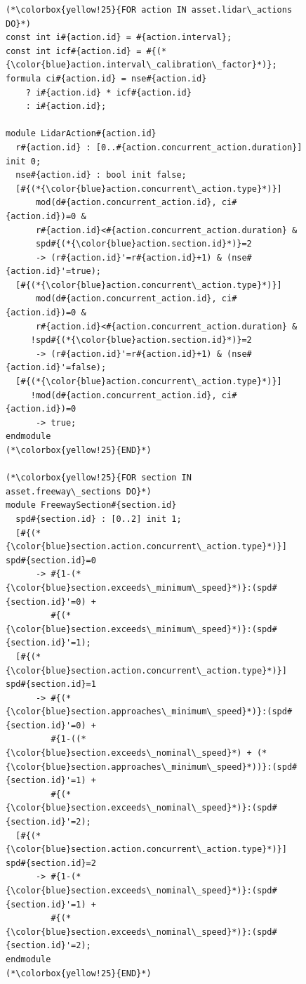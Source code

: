 \begin{figure}[!ht]
\begin{lstlisting}[caption={DTMC template for traffic surveillance},label=lst:DTMC_traffic_surveillance_template]
(*\colorbox{yellow!25}{FOR action IN asset.lidar\_actions DO}*)
const int i#{action.id} = #{action.interval};
const int icf#{action.id} = #{(*{\color{blue}action.interval\_calibration\_factor}*)};
formula ci#{action.id} = nse#{action.id}
    ? i#{action.id} * icf#{action.id}
    : i#{action.id};

module LidarAction#{action.id}
  r#{action.id} : [0..#{action.concurrent_action.duration}] init 0;
  nse#{action.id} : bool init false;
  [#{(*{\color{blue}action.concurrent\_action.type}*)}]
      mod(d#{action.concurrent_action.id}, ci#{action.id})=0 &
      r#{action.id}<#{action.concurrent_action.duration} &
      spd#{(*{\color{blue}action.section.id}*)}=2
      -> (r#{action.id}'=r#{action.id}+1) & (nse#{action.id}'=true);
  [#{(*{\color{blue}action.concurrent\_action.type}*)}]
      mod(d#{action.concurrent_action.id}, ci#{action.id})=0 &
      r#{action.id}<#{action.concurrent_action.duration} &
     !spd#{(*{\color{blue}action.section.id}*)}=2
      -> (r#{action.id}'=r#{action.id}+1) & (nse#{action.id}'=false);
  [#{(*{\color{blue}action.concurrent\_action.type}*)}]
     !mod(d#{action.concurrent_action.id}, ci#{action.id})=0
      -> true;
endmodule
(*\colorbox{yellow!25}{END}*)

(*\colorbox{yellow!25}{FOR section IN asset.freeway\_sections DO}*)
module FreewaySection#{section.id}
  spd#{section.id} : [0..2] init 1;
  [#{(*{\color{blue}section.action.concurrent\_action.type}*)}] spd#{section.id}=0
      -> #{1-(*{\color{blue}section.exceeds\_minimum\_speed}*)}:(spd#{section.id}'=0) +
         #{(*{\color{blue}section.exceeds\_minimum\_speed}*)}:(spd#{section.id}'=1);
  [#{(*{\color{blue}section.action.concurrent\_action.type}*)}] spd#{section.id}=1
      -> #{(*{\color{blue}section.approaches\_minimum\_speed}*)}:(spd#{section.id}'=0) +
         #{1-((*{\color{blue}section.exceeds\_nominal\_speed}*) + (*{\color{blue}section.approaches\_minimum\_speed}*))}:(spd#{section.id}'=1) +
         #{(*{\color{blue}section.exceeds\_nominal\_speed}*)}:(spd#{section.id}'=2);
  [#{(*{\color{blue}section.action.concurrent\_action.type}*)}] spd#{section.id}=2
      -> #{1-(*{\color{blue}section.exceeds\_nominal\_speed}*)}:(spd#{section.id}'=1) +
         #{(*{\color{blue}section.exceeds\_nominal\_speed}*)}:(spd#{section.id}'=2);
endmodule
(*\colorbox{yellow!25}{END}*)
\end{lstlisting}
\end{figure}

